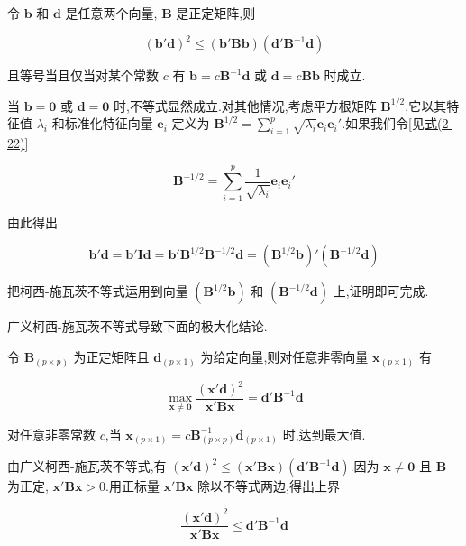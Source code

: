  令 $\bm{b}$ 和 $\bm{d}$ 是任意两个向量, $\bm{B}$ 是正定矩阵,则

\label{eq:2-49}
\begin{equation}
(\bm{b}'\bm{d})^2 \leqslant (\bm{b}'\bm{B}\bm{b})(\bm{d}'\bm{B}^{-1}\bm{d}) \tag{2-49}
\end{equation}

且等号当且仅当对某个常数 $c$ 有 $\bm{b} = c\bm{B}^{-1}\bm{d}$ 或 $\bm{d} = c\bm{B}\bm{b}$ 时成立.

 当 $\bm{b} = \bm{0}$ 或 $\bm{d} = \bm{0}$ 时,不等式显然成立.对其他情况,考虑平方根矩阵 $\bm{B}^{1/2}$,它以其特征值 $\lambda_i$ 和标准化特征向量 $\bm{e}_i$ 定义为 $\bm{B}^{1/2} = \sum_{i=1}^{p}\sqrt{\lambda_i}\bm{e}_i\bm{e}_i'$.如果我们令[见\hyperref[eq:2-22]{式(2-22)}]

\[
\bm{B}^{-1/2} = \sum_{i=1}^{p}\frac{1}{\sqrt{\lambda_i}}\bm{e}_i\bm{e}_i'
\]

由此得出

\[
\bm{b}'\bm{d} = \bm{b}'\bm{I}\bm{d} = \bm{b}'\bm{B}^{1/2}\bm{B}^{-1/2}\bm{d} = (\bm{B}^{1/2}\bm{b})'(\bm{B}^{-1/2}\bm{d})
\]

把柯西-施瓦茨不等式运用到向量 $(\bm{B}^{1/2}\bm{b})$ 和 $(\bm{B}^{-1/2}\bm{d})$ 上,证明即可完成.

广义柯西-施瓦茨不等式导致下面的极大化结论.

 令 $\bm{B}_{(p \times p)}$ 为正定矩阵且 $\bm{d}_{(p \times 1)}$ 为给定向量,则对任意非零向量 $\bm{x}_{(p \times 1)}$ 有

\label{eq:2-50}
\begin{equation}
\max_{\bm{x} \neq \bm{0}} \frac{(\bm{x}'\bm{d})^2}{\bm{x}'\bm{B}\bm{x}} = \bm{d}'\bm{B}^{-1}\bm{d} \tag{2-50}
\end{equation}

对任意非零常数 $c$,当 $\bm{x}_{(p \times 1)} = c\bm{B}_{(p \times p)}^{-1}\bm{d}_{(p \times 1)}$ 时,达到最大值.

 由广义柯西-施瓦茨不等式,有 $(\bm{x}'\bm{d})^2 \leqslant (\bm{x}'\bm{B}\bm{x})(\bm{d}'\bm{B}^{-1}\bm{d})$.因为 $\bm{x} \neq \bm{0}$ 且 $\bm{B}$ 为正定, $\bm{x}'\bm{B}\bm{x} > 0$.用正标量 $\bm{x}'\bm{B}\bm{x}$ 除以不等式两边,得出上界

\[
\frac{(\bm{x}'\bm{d})^2}{\bm{x}'\bm{B}\bm{x}} \leqslant \bm{d}'\bm{B}^{-1}\bm{d}
\]
